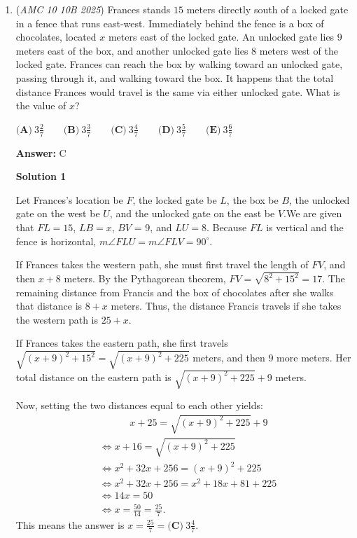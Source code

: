 \begin{enumerate}
 


	\item (\textit{AMC 10 10B 2025}) Frances stands $15$ meters directly south of a locked gate in a fence that runs east-west. Immediately behind the fence is a box of chocolates, located $x$ meters east of the locked gate. An unlocked gate lies $9$ meters east of the box, and another unlocked gate lies $8$ meters west of the locked gate. Frances can reach the box by walking toward an unlocked gate, passing through it, and walking toward the box. It happens that the total distance Frances would travel is the same via either unlocked gate. What is the value of $x$?


 $\textbf{(A)}~3\frac27 \qquad \textbf{(B)}~3\frac37 \qquad \textbf{(C)}~3\frac47 \qquad \textbf{(D)}~3\frac57 \qquad \textbf{(E)}~3\frac67$

 \textbf{Answer: }C



\textbf{Solution 1}

Let Frances's location be $F$, the locked gate be $L$, the box be $B$, the unlocked gate on the west be $U$, and the unlocked gate on the east be $V$.We are given that $FL = 15$, $LB = x$, $BV$ = 9, and $LU = 8$. Because $FL$ is vertical and the fence is horizontal, $m \angle FLU = m \angle FLV = 90^\circ$. 

 If Frances takes the western path, she must first travel the length of $FV$, and then $x + 8$ meters. By the Pythagorean theorem, $FV = \sqrt{8^2 + 15^2} = 17$. The remaining distance from Francis and the box of chocolates after she walks that distance is $8 + x$ meters. Thus, the distance Francis travels if she takes the western path is $25 + x$.

 If Frances takes the eastern path, she first travels $\sqrt{(x + 9)^2 + 15^2} = \sqrt{(x + 9)^2 + 225}$ meters, and then $9$ more meters. Her total distance on the eastern path is $\sqrt{(x + 9)^2 + 225} + 9$ meters.

 Now, setting the two distances equal to each other yields:
 \begin{align*}&\qquad\;\;\;\; x + 25 = \sqrt{(x + 9)^2 + 225} + 9 \\ &\iff x + 16 = \sqrt{(x + 9)^2 + 225} \\ &\iff x^2 + 32x + 256 = (x + 9)^2 + 225 \\ &\iff x^2 + 32x + 256 = x^2 + 18x + 81 + 225 \\ &\iff 14x = 50 \\ &\iff x = \frac{50}{14} = \frac{25}{7}.\end{align*}
This means the answer is $x = \frac{25}{7} = \boxed{\textbf{(C)}\hspace{3pt}3\frac{4}{7}}$. 


\end{enumerate}
